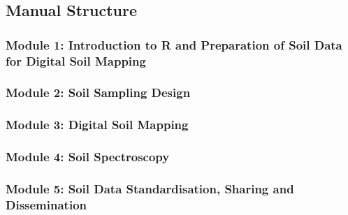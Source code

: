 \documentclass[
  10pt,
  b5paper,
  oneside]{book}
\begin{document}
\subsection*{Manual Structure}\label{manual-structure}

\subsubsection*{\texorpdfstring{\textbf{Module 1: Introduction to R and Preparation of Soil Data for Digital Soil Mapping}}{Module 1: Introduction to R and Preparation of Soil Data for Digital Soil Mapping}}\label{module-1-introduction-to-r-and-preparation-of-soil-data-for-digital-soil-mapping}

\subsubsection*{\texorpdfstring{\textbf{Module 2: Soil Sampling Design}}{Module 2: Soil Sampling Design}}\label{module-2-soil-sampling-design}

\subsubsection*{\texorpdfstring{\textbf{Module 3: Digital Soil Mapping}}{Module 3: Digital Soil Mapping}}\label{module-3-digital-soil-mapping}

\subsubsection*{\texorpdfstring{\textbf{Module 4: Soil Spectroscopy}}{Module 4: Soil Spectroscopy}}\label{module-4-soil-spectroscopy}

\subsubsection*{\texorpdfstring{\textbf{Module 5: Soil Data Standardisation, Sharing and Dissemination}}{Module 5: Soil Data Standardisation, Sharing and Dissemination}}\label{module-5-soil-data-standardisation-sharing-and-dissemination}
\end{document}
